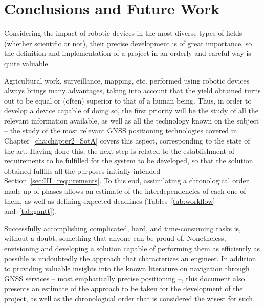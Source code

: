 

\chapter{Conclusions and Future Work}\label{cha:chapterFinal_Conclusion}

Considering the impact of robotic devices in the most diverse types of fields (whether scientific or not), their precise development is of great importance, so the definition and implementation of a project in an orderly and careful way is quite valuable.

Agricultural work, surveillance, mapping, etc. performed using robotic devices always brings many advantages, taking into account that the yield obtained turns out to be equal or (often) superior to that of a human being.
Thus, in order to develop a device capable of doing so, the first priority will be the study of all the relevant information available, as well as all the technology known on the subject -- the study of the most relevant GNSS positioning technologies covered in Chapter~\ref{cha:chapter2_SotA} covers this aspect, corresponding to the state of the art.
Having done this, the next step is related to the establishment of requirements to be fulfilled for the system to be developed, so that the solution obtained fulfills all the purposes initially intended -- Section~\ref{sec:III_requirements}. To this end, assimilating a chronological order made up of phases allows an estimate of the interdependencies of each one of them, as well as defining expected deadlines (Tables~\ref{tab:workflow} and~\ref{tab:gantt}).\\

\par Successfully accomplishing complicated, hard, and time-consuming tasks is, without a doubt, something that anyone can be proud of. Nonetheless, envisioning and developing a solution capable of performing them as efficiently as possible is undoubtedly the approach that characterizes an engineer. In addition to providing valuable insights into the known literature on navigation through GNSS services -- most emphatically precise positioning --, this document also presents an estimate of the approach to be taken for the development of the project, as well as the chronological order that is considered the wisest for such.

